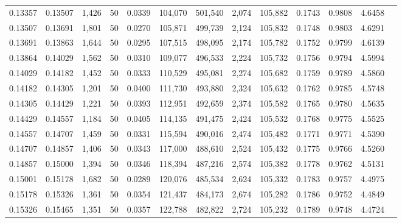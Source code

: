 \begin{tabular}{rrrrrrrrrrrrr}
0.13357 & 0.13507 & 1,426 &  50 &                                     0.0339 & 104,070 & 501,540 &   2,074 & 105,882 & 0.1743 & 0.9808 & 4.6458 \\
0.13507 & 0.13691 & 1,801 &  50 &                                     0.0270 & 105,871 & 499,739 &   2,124 & 105,832 & 0.1748 & 0.9803 & 4.6291 \\
0.13691 & 0.13863 & 1,644 &  50 &                                     0.0295 & 107,515 & 498,095 &   2,174 & 105,782 & 0.1752 & 0.9799 & 4.6139 \\
0.13864 & 0.14029 & 1,562 &  50 &                                     0.0310 & 109,077 & 496,533 &   2,224 & 105,732 & 0.1756 & 0.9794 & 4.5994 \\
0.14029 & 0.14182 & 1,452 &  50 &                                     0.0333 & 110,529 & 495,081 &   2,274 & 105,682 & 0.1759 & 0.9789 & 4.5860 \\
0.14182 & 0.14305 & 1,201 &  50 &                                     0.0400 & 111,730 & 493,880 &   2,324 & 105,632 & 0.1762 & 0.9785 & 4.5748 \\
0.14305 & 0.14429 & 1,221 &  50 &                                     0.0393 & 112,951 & 492,659 &   2,374 & 105,582 & 0.1765 & 0.9780 & 4.5635 \\
0.14429 & 0.14557 & 1,184 &  50 &                                     0.0405 & 114,135 & 491,475 &   2,424 & 105,532 & 0.1768 & 0.9775 & 4.5525 \\
0.14557 & 0.14707 & 1,459 &  50 &                                     0.0331 & 115,594 & 490,016 &   2,474 & 105,482 & 0.1771 & 0.9771 & 4.5390 \\
0.14707 & 0.14857 & 1,406 &  50 &                                     0.0343 & 117,000 & 488,610 &   2,524 & 105,432 & 0.1775 & 0.9766 & 4.5260 \\
0.14857 & 0.15000 & 1,394 &  50 &                                     0.0346 & 118,394 & 487,216 &   2,574 & 105,382 & 0.1778 & 0.9762 & 4.5131 \\
0.15001 & 0.15178 & 1,682 &  50 &                                     0.0289 & 120,076 & 485,534 &   2,624 & 105,332 & 0.1783 & 0.9757 & 4.4975 \\
0.15178 & 0.15326 & 1,361 &  50 &                                     0.0354 & 121,437 & 484,173 &   2,674 & 105,282 & 0.1786 & 0.9752 & 4.4849 \\
0.15326 & 0.15465 & 1,351 &  50 &                                     0.0357 & 122,788 & 482,822 &   2,724 & 105,232 & 0.1789 & 0.9748 & 4.4724 \\

\end{tabular}
